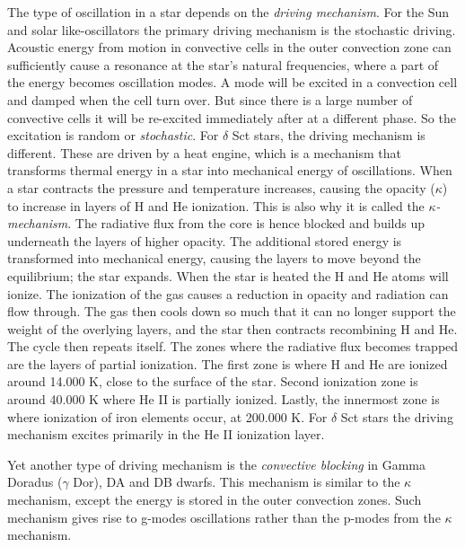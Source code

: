 The type of oscillation in a star depends on the \textit{driving mechanism}. For the Sun and solar like-oscillators the primary driving mechanism is the stochastic driving. Acoustic energy from motion in convective cells in the outer convection zone can sufficiently cause a resonance at the star's natural frequencies, where a part of the energy becomes oscillation modes. A mode will be excited in a convection cell and damped when the cell turn over. But since there is a large number of convective cells it will be re-excited immediately after at a different phase. So the excitation is random or \textit{stochastic}. 
For $\delta$ Sct stars, the driving mechanism is different. These are driven by a heat engine, which is a mechanism that transforms thermal energy in a star into mechanical energy of oscillations. When a star contracts the pressure and temperature increases, causing the opacity ($\kappa$) to increase in layers of H and He ionization. This is also why it is called the \textit{$\kappa$-mechanism}. The radiative flux from the core is hence blocked and builds up underneath the layers of higher opacity. The additional stored energy is transformed into mechanical energy, causing the layers to move beyond the equilibrium; the star expands. When the star is heated the H and He atoms will ionize. The ionization of the gas causes a reduction in opacity and radiation can flow through. The gas then cools down so much that it can no longer support the weight of the overlying layers, and the star then contracts recombining H and He. The cycle then repeats itself. 
The zones where the radiative flux becomes trapped are the layers of partial ionization. The first zone is where H and He are ionized around 14.000 K, close to the surface of the star. Second ionization zone is around 40.000 K where He II is partially ionized. Lastly, the innermost zone is where ionization of iron elements occur, at 200.000 K. For $\delta$ Sct stars the driving mechanism excites primarily in the He II ionization layer.   

Yet another type of driving mechanism is the \textit{convective blocking} in Gamma Doradus ($\gamma$ Dor), DA and DB dwarfs. This mechanism is similar to the $\kappa$ mechanism, except the energy is stored in the outer convection zones. Such mechanism gives rise to g-modes oscillations rather than the p-modes from the $\kappa$ mechanism. 


